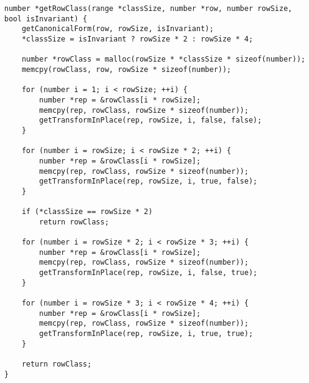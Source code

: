 \begin{lstlisting}[caption={Computing and storing a row class in memory.},label={getRowClass}]
number *getRowClass(range *classSize, number *row, number rowSize, bool isInvariant) {
    getCanonicalForm(row, rowSize, isInvariant);
    *classSize = isInvariant ? rowSize * 2 : rowSize * 4;

    number *rowClass = malloc(rowSize * *classSize * sizeof(number));
    memcpy(rowClass, row, rowSize * sizeof(number));

    for (number i = 1; i < rowSize; ++i) {
        number *rep = &rowClass[i * rowSize];
        memcpy(rep, rowClass, rowSize * sizeof(number));
        getTransformInPlace(rep, rowSize, i, false, false);
    }

    for (number i = rowSize; i < rowSize * 2; ++i) {
        number *rep = &rowClass[i * rowSize];
        memcpy(rep, rowClass, rowSize * sizeof(number));
        getTransformInPlace(rep, rowSize, i, true, false);
    }

    if (*classSize == rowSize * 2)
        return rowClass;

    for (number i = rowSize * 2; i < rowSize * 3; ++i) {
        number *rep = &rowClass[i * rowSize];
        memcpy(rep, rowClass, rowSize * sizeof(number));
        getTransformInPlace(rep, rowSize, i, false, true);
    }

    for (number i = rowSize * 3; i < rowSize * 4; ++i) {
        number *rep = &rowClass[i * rowSize];
        memcpy(rep, rowClass, rowSize * sizeof(number));
        getTransformInPlace(rep, rowSize, i, true, true);
    }

    return rowClass;
}
\end{lstlisting}

